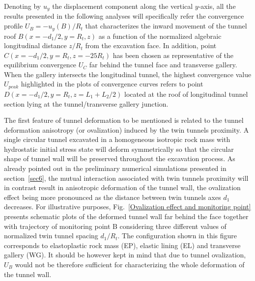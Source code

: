 \documentclass[Journal,letterpaper, NoLists,SectionNumbers]{ascelike-new}
\begin{document}
Denoting by $u_y$ the displacement component along the vertical  $y$-axis, all the results presented in the following analyses will specifically refer the convergence profile $U_B=-u_y(B)/R_t$ that characterizes the inward movement of the tunnel roof $B(x = -d_1/2, y = R_t, z)$ as a function of the normalized algebraic longitudinal distance $z/R_t$ from the excavation face. In addition, point  $C(x=-d_1/2, y =R_t, z = -25R_t)$ has been chosen as representative of the equilibrium convergence $U_C$ far behind the tunnel face and transverse gallery. When the gallery intersects the longitudinal tunnel, the highest convergence value $U_{peak}$ highlighted in the plots of convergence curves refers to point $D(x=-d_1/2, y = R_t, z = L_1+L_2/2)$ located at the roof of longitudinal tunnel section lying at the tunnel/transverse gallery junction.

The first feature of tunnel deformation to be mentioned is related to the tunnel deformation anisotropy (or ovalization) induced by the twin tunnels proximity. A single circular tunnel excavated in a homogeneous isotropic rock mass with hydrostatic initial stress state will deform symmetrically so that the circular shape of tunnel wall will be preserved throughout the excavation process. As already pointed out in the preliminary numerical simulations presented in section~\ref{sec6}, the mutual interaction associated with twin tunnels proximity will in contrast result in anisotropic deformation of the tunnel wall, the ovalization effect being more pronounced as the distance between twin tunnels axes $d_1$ decreases. For illustrative purposes, Fig.~\ref{Ovalization effect and monitoring point} presents schematic plots of the deformed tunnel wall far behind the face together with trajectory of monitoring point B considering three different values of normalized twin tunnel spacing $d_1/R_t$. The configuration shown in this figure corresponds to elastoplastic rock mass (EP), elastic lining (EL) and transverse gallery (WG). It should be however kept in mind that due to tunnel ovalization, $U_B$ would not be therefore sufficient for characterizing the whole deformation of the tunnel wall.
\end{document}
